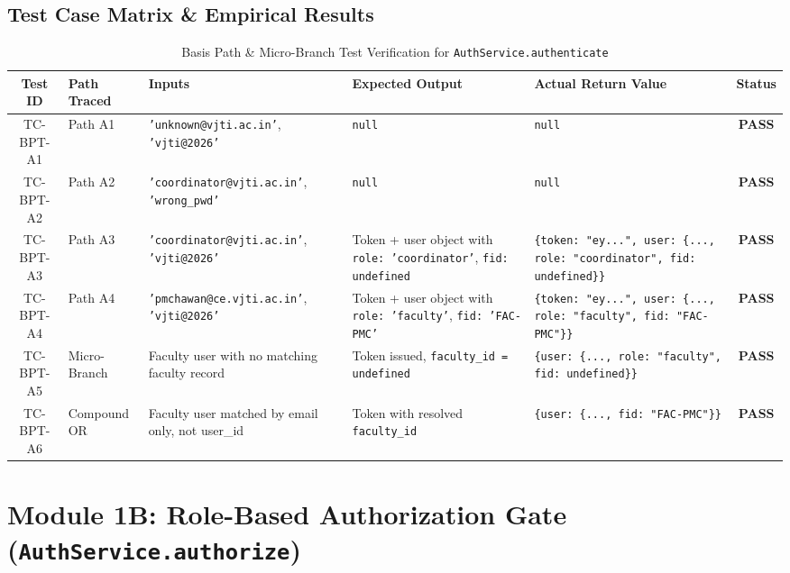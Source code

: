 \documentclass[11pt,a4paper]{article}
\begin{document}
\subsection{Test Case Matrix \& Empirical Results}
\begin{table}[H]
\centering
\scriptsize
\begin{tabular}{@{}clp{3.2cm}p{3.5cm}p{3.5cm}c@{}}
\toprule
\textbf{Test ID} & \textbf{Path Traced} & \textbf{Inputs} & \textbf{Expected Output} & \textbf{Actual Return Value} & \textbf{Status} \\ \midrule
TC-BPT-A1 & Path A1 & \texttt{'unknown@vjti.ac.in'}, \texttt{'vjti@2026'} & \texttt{null} & \texttt{null} & \textbf{PASS} \\
TC-BPT-A2 & Path A2 & \texttt{'coordinator@vjti.ac.in'}, \texttt{'wrong\_pwd'} & \texttt{null} & \texttt{null} & \textbf{PASS} \\
TC-BPT-A3 & Path A3 & \texttt{'coordinator@vjti.ac.in'}, \texttt{'vjti@2026'} & Token + user object with \texttt{role: 'coordinator'}, \texttt{fid: undefined} & \texttt{\{token: "ey...", user: \{..., role: "coordinator", fid: undefined\}\}} & \textbf{PASS} \\
TC-BPT-A4 & Path A4 & \texttt{'pmchawan@ce.vjti.ac.in'}, \texttt{'vjti@2026'} & Token + user object with \texttt{role: 'faculty'}, \texttt{fid: 'FAC-PMC'} & \texttt{\{token: "ey...", user: \{..., role: "faculty", fid: "FAC-PMC"\}\}} & \textbf{PASS} \\
TC-BPT-A5 & Micro-Branch & Faculty user with no matching faculty record & Token issued, \texttt{faculty\_id = undefined} & \texttt{\{user: \{..., role: "faculty", fid: undefined\}\}} & \textbf{PASS} \\
TC-BPT-A6 & Compound OR & Faculty user matched by email only, not user\_id & Token with resolved \texttt{faculty\_id} & \texttt{\{user: \{..., fid: "FAC-PMC"\}\}} & \textbf{PASS} \\ \bottomrule
\end{tabular}
\caption{Basis Path \& Micro-Branch Test Verification for \texttt{AuthService.authenticate}}
\end{table}

\newpage
\section{Module 1B: Role-Based Authorization Gate (\texttt{AuthService.authorize})}
\end{document}
